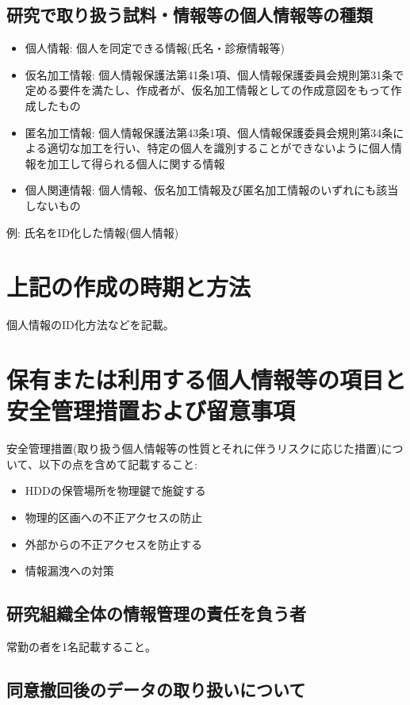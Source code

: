 \documentclass{kyodai-protocol}
\begin{document}
\subsection{研究で取り扱う試料・情報等の個人情報等の種類}

\begin{itemize}
\item 個人情報: 個人を同定できる情報(氏名・診療情報等)
\item 仮名加工情報: 個人情報保護法第41条1項、個人情報保護委員会規則第31条で定める要件を満たし、作成者が、仮名加工情報としての作成意図をもって作成したもの
\item 匿名加工情報: 個人情報保護法第43条1項、個人情報保護委員会規則第34条による適切な加工を行い、特定の個人を識別することができないように個人情報を加工して得られる個人に関する情報
\item 個人関連情報: 個人情報、仮名加工情報及び匿名加工情報のいずれにも該当しないもの
\end{itemize}

例: 氏名をID化した情報(個人情報)

\section{上記の作成の時期と方法}

個人情報のID化方法などを記載。

\section{保有または利用する個人情報等の項目と安全管理措置および留意事項}

安全管理措置(取り扱う個人情報等の性質とそれに伴うリスクに応じた措置)について、以下の点を含めて記載すること:
\begin{itemize}
\item HDDの保管場所を物理鍵で施錠する
\item 物理的区画への不正アクセスの防止
\item 外部からの不正アクセスを防止する
\item 情報漏洩への対策
\end{itemize}

\subsection{研究組織全体の情報管理の責任を負う者}

常勤の者を1名記載すること。

\subsection{同意撤回後のデータの取り扱いについて}
\end{document}
